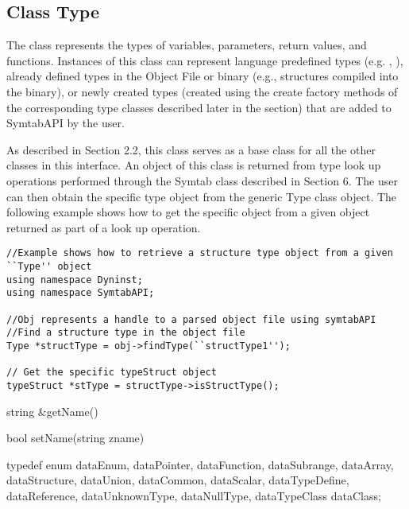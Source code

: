 \subsection{Class Type}

The class  represents the types of variables, parameters, return values, and functions. Instances of this class can represent language predefined types (e.g. , ), already defined types in the Object File or binary (e.g., structures compiled into the binary), or newly created types (created using the create factory methods of the corresponding type classes described later in the section) that are added to SymtabAPI by the user. 

As described in Section 2.2, this class serves as a base class for all the other classes in this interface. An object of this class is returned from type look up operations performed through the Symtab class described in Section 6. The user can then obtain the specific type object from the generic Type class object. The following example shows how to get the specific object from a given  object returned as part of a look up operation.

\begin{lstlisting}
//Example shows how to retrieve a structure type object from a given ``Type'' object
using namespace Dyninst;
using namespace SymtabAPI;

//Obj represents a handle to a parsed object file using symtabAPI
//Find a structure type in the object file
Type *structType = obj->findType(``structType1'');

// Get the specific typeStruct object
typeStruct *stType = structType->isStructType();
\end{lstlisting}

\begin{apient}
string &getName()
\end{apient}

\begin{apient}
bool setName(string zname)
\end{apient}

\begin{apient}
typedef enum{ 
    dataEnum,
    dataPointer,
    dataFunction,
    dataSubrange,
    dataArray,
    dataStructure,
    dataUnion,
    dataCommon,
    dataScalar,
    dataTypeDefine,
    dataReference,
    dataUnknownType,
    dataNullType,
    dataTypeClass
} dataClass;
\end{apient}

